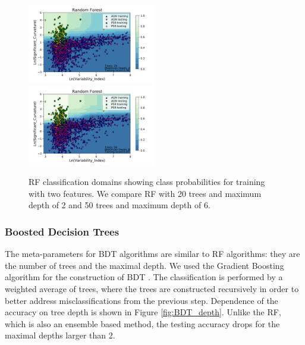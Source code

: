 \begin{figure}[h]
\includegraphics[width=0.5\textwidth]{plots/classification_domains/rf_20_2_final.pdf}
\includegraphics[width=0.5\textwidth]{plots/classification_domains/rf_50_6_final.pdf}
\caption{RF classification domains showing class probabilities for training with two features. 
We compare RF with 20 trees and maximum depth of 2 and 50 trees and maximum depth of 6.
}  
\label{fig:RF_domains}
\end{figure}



\subsubsection{Boosted Decision Trees}

The meta-parameters for BDT algorithms are similar to RF algorithms: they are the number of trees and the maximal depth.
We used the Gradient Boosting algorithm for the construction of BDT \citep{gb}.
The classification is performed by a weighted average of trees, where the trees are constructed recursively in order to better address 
misclassifications from the previous step. 
Dependence of the accuracy on tree depth is shown in Figure \ref{fig:BDT_depth}. 
Unlike the RF, which is also an ensemble based method, the testing accuracy drops for the maximal depths larger than 2. 

